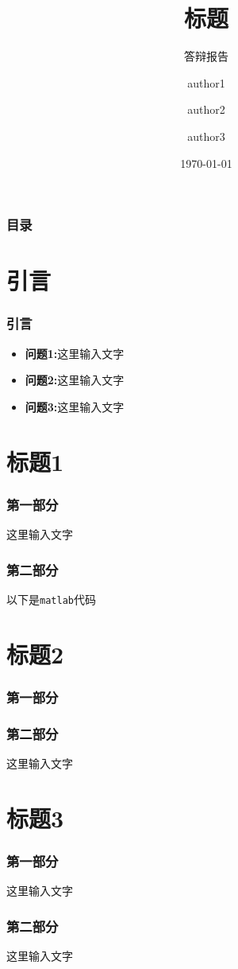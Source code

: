 \documentclass[16pt]{beamer}
\title[标题]{标题}
\subtitle{答辩报告} %
\author[数学与统计学院]{author1 \inst{1} \and author2 \inst{1} \and author3 \inst{1}}
\institute[某大学]{\inst{1}信息与计算科学}
\date[\today] %
{\today}
\begin{document}
	\frame{\titlepage}
	
	\begin{frame}
	\frametitle{目录}
		\tableofcontents
	\end{frame}
	
\section{引言}
	\begin{frame}
		\frametitle{引言}
		\begin{itemize}
			\item \textbf{问题1:}这里输入文字
			\item \textbf{问题2:}这里输入文字
			\item \textbf{问题3:}这里输入文字
		\end{itemize}
	\end{frame}
	
\section{标题1}
	\begin{frame}
		\frametitle{第一部分}
		这里输入文字
	\end{frame}

	\begin{frame}
	\frametitle{第二部分}
	以下是\texttt{matlab}代码
	 
	

	\end{frame}

\section{标题2}
\begin{frame}
	\frametitle{第一部分}

\end{frame}

\begin{frame}
	\frametitle{第二部分}
	这里输入文字\cite{ref}
\end{frame}

\section{标题3}
\begin{frame}
	\frametitle{第一部分}
	这里输入文字
\end{frame}

\begin{frame}
	\frametitle{第二部分}
	这里输入文字
\end{frame}
\end{document}
